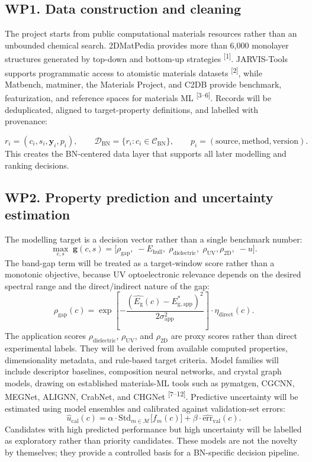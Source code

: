 \documentclass[10pt]{article}
\newcommand{\eg}{E_{\mathrm{g}}}
\newcommand{\ehull}{E_{\mathrm{hull}}}
\newcommand{\unc}{u}
\newcommand{\gapscore}{\rho_{\mathrm{gap}}}
\begin{document}
\subsection*{WP1. Data construction and cleaning}
The project starts from public computational materials resources rather than an unbounded chemical search. 2DMatPedia provides more than 6,000 monolayer structures generated by top-down and bottom-up strategies \textsuperscript{[1]}. JARVIS-Tools supports programmatic access to atomistic materials datasets \textsuperscript{[2]}, while Matbench, matminer, the Materials Project, and C2DB provide benchmark, featurization, and reference spaces for materials ML \textsuperscript{[3--6]}. Records will be deduplicated, aligned to target-property definitions, and labelled with provenance:

\[
  r_i=(c_i,s_i,\mathbf{y}_i,p_i),\qquad
  \mathcal{D}_{\mathrm{BN}}=\{r_i:c_i\in\mathcal{C}_{\mathrm{BN}}\},\qquad
  p_i=(\mathrm{source},\mathrm{method},\mathrm{version}).
\]
This creates the BN-centered data layer that supports all later modelling and ranking decisions.

\subsection*{WP2. Property prediction and uncertainty estimation}
The modelling target is a decision vector rather than a single benchmark number:
\[
  \max_{c,s}\; \mathbf{g}(c,s)=
  \big[\gapscore,\;-\ehull,\;\rho_{\mathrm{dielectric}},\;\rho_{\mathrm{UV}},
  \rho_{\mathrm{2D}},\;-\unc\big].
\]
The band-gap term will be treated as a target-window score rather than a monotonic objective, because UV optoelectronic relevance depends on the desired spectral range and the direct/indirect nature of the gap:
\[
  \gapscore(c)=
  \exp\!\left[-\frac{(\hat{\eg}(c)-E^{*}_{\mathrm{g,app}})^2}
  {2\sigma_{\mathrm{app}}^2}\right]\cdot \eta_{\mathrm{direct}}(c).
\]
The application scores $\rho_{\mathrm{dielectric}}$, $\rho_{\mathrm{UV}}$, and $\rho_{\mathrm{2D}}$ are proxy scores rather than direct experimental labels. They will be derived from available computed properties, dimensionality metadata, and rule-based target criteria.
Model families will include descriptor baselines, composition neural networks, and crystal graph models, drawing on established materials-ML tools such as pymatgen, CGCNN, MEGNet, ALIGNN, CrabNet, and CHGNet \textsuperscript{[7--12]}. Predictive uncertainty will be estimated using model ensembles and calibrated against validation-set errors:
\[
  \hat{\unc}_{\mathrm{cal}}(c)=
  \alpha\cdot \mathrm{Std}_{m\in\mathcal{M}}\big[f_m(c)\big]+
  \beta\cdot \widehat{\mathrm{err}}_{\mathrm{val}}(c).
\]
Candidates with high predicted performance but high uncertainty will be labelled as exploratory rather than priority candidates. These models are not the novelty by themselves; they provide a controlled basis for a BN-specific decision pipeline.
\end{document}
